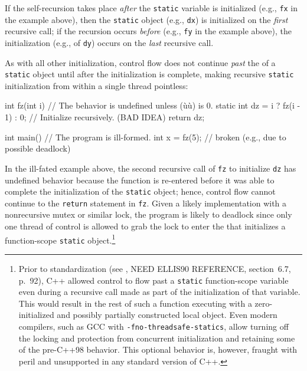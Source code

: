 \noindent If the self-recursion takes place \emph{after} the \lstinline!static!
variable is initialized (e.g., \lstinline!fx! in the example above), then the
\lstinline!static! object (e.g., \lstinline!dx!) is initialized on the
\emph{first} recursive call; if the recursion occurs \emph{before}
(e.g., \lstinline!fy! in the example above), the initialization (e.g., of \lstinline!dy!)
occurs on the \emph{last} recursive call.

As with all other initialization, control flow does not continue
\emph{past} the  of a \lstinline!static! object until
after the initialization is complete, making recursive \lstinline!static!
initialization from within a single thread pointless:

\begin{emcppslisting}
int fz(int i)  // The behavior is undefined unless (ù{}ù) is 0.
{
    static int dz = i ? fz(i - 1) : 0;  // Initialize recursively. (BAD IDEA)
    return dz;
}

int main()  // The program is ill-formed.
{
    int x = fz(5);  // broken (e.g., due to possible deadlock)
}
\end{emcppslisting}

\noindent In the ill-fated example above, the second recursive call of \lstinline!fz!
to initialize \lstinline!dz! has undefined behavior because the function is
re-entered before it was able to complete the initialization of the
\lstinline!static! object; hence, control flow cannot continue to the
\lstinline!return! statement in \lstinline!fz!. Given a likely implementation
with a nonrecursive mutex or similar lock, the program is likely to
deadlock
since only one thread of control is allowed to
grab the lock to enter the  that
initializes a function-scope \lstinline!static!
object.{\cprotect\footnote{Prior to standardization (see \cite{ellis90},
NEED ELLIS90 REFERENCE, section~6.7, p.~92), C++ allowed control to flow past a
\lstinline!static! function-scope variable even during a recursive call
made as part of the initialization of that variable. This would result
in the rest of such a function executing with a zero-initialized and
possibly partially constructed local object. Even modern compilers,
such as GCC with \lstinline!-fno-threadsafe-statics!, allow turning off
the locking and protection from concurrent initialization and
retaining some of the pre-C++98 behavior. This optional behavior is,
however, fraught with peril and unsupported in any standard version of
  C++.}}

